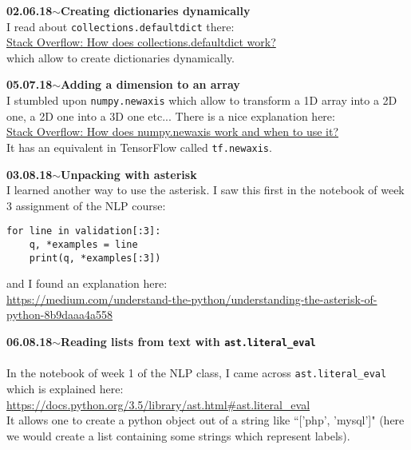 \documentclass[11pt,a4paper]{article}
\newenvironment{loggentry}[2]%
{\noindent\textbf{#1}\hspace{1cm}$\mathbf{\sim}$\text{ }\textbf{#2}\\}{\vspace{0.5cm}}
\begin{document}
\begin{loggentry}{02.06.18}{Creating dictionaries dynamically}
I read about \texttt{collections.defaultdict} there:\\
\href{https://stackoverflow.com/questions/5900578/how-does-collections-defaultdict-work}{Stack Overflow: How does collections.defaultdict work?}\\
which allow to create dictionaries dynamically.
\end{loggentry}

\begin{loggentry}{05.07.18}{Adding a dimension to an array}
I stumbled upon \texttt{numpy.newaxis} which allow to transform a 1D array into a 2D one, a 2D one into a 3D one etc... There is a nice explanation here:\\
\href{https://stackoverflow.com/questions/29241056/how-does-numpy-newaxis-work-and-when-to-use-it#29241239}{Stack Overflow: How does numpy.newaxis work and when to use it?}\\
It has an equivalent in TensorFlow called \texttt{tf.newaxis}.
\end{loggentry}

\begin{loggentry}{03.08.18}{Unpacking with asterisk}
I learned another way to use the asterisk. I saw this first in the notebook of week 3 assignment of the NLP course:
\begin{verbatim}
for line in validation[:3]:
    q, *examples = line
    print(q, *examples[:3])
\end{verbatim}
and I found an explanation here:\\
\url{https://medium.com/understand-the-python/understanding-the-asterisk-of-python-8b9daaa4a558}\\
\end{loggentry}

\begin{loggentry}{06.08.18}{Reading lists from text with \texttt{ast.literal\_eval}}\\
In the notebook of week 1 of the NLP class, I came across \texttt{ast.literal\_eval} which is explained here:\\
\url{https://docs.python.org/3.5/library/ast.html#ast.literal_eval}\\
It allows one to create a python object out of a string like ``['php', 'mysql']" (here we would create a list containing some strings which represent labels).
\end{loggentry}
\end{document}
